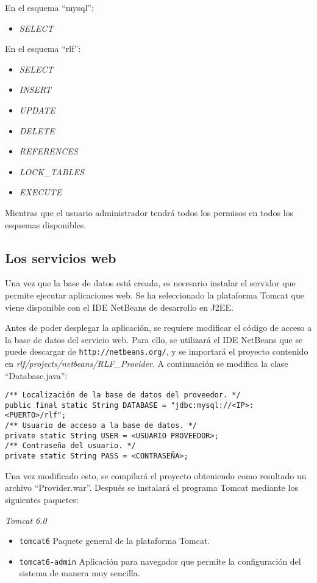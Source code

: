 En el esquema ``mysql'':
\begin{itemize}
\item \emph{SELECT}
\end{itemize}

En el esquema ``rlf'':
\begin{itemize}
\item \emph{SELECT}
\item \emph{INSERT}
\item \emph{UPDATE}
\item \emph{DELETE}
\item \emph{REFERENCES}
\item \emph{LOCK\_TABLES}
\item \emph{EXECUTE}
\end{itemize}

Mientras que el usuario administrador tendrá todos los permisos en 
todos los esquemas disponibles.

\subsection*{Los servicios web}
Una vez que la base de datos está creada, es necesario instalar el 
servidor que permite ejecutar aplicaciones web. Se ha seleccionado la 
plataforma Tomcat que viene disponible con el IDE NetBeans de 
desarrollo en J2EE.

Antes de poder desplegar la aplicación, se requiere modificar el 
código de acceso a la base de datos del servicio web. Para ello, se 
utilizará el IDE NetBeans que se puede descargar de 
\texttt{http://netbeans.org/}, y se importará el proyecto contenido en 
\emph{rlf/projects/netbeans/RLF\_Provider}. A continuación se modifica la 
clase ``Database.java'':

\begin{verbatim}
/** Localización de la base de datos del proveedor. */
public final static String DATABASE = "jdbc:mysql://<IP>:<PUERTO>/rlf";
/** Usuario de acceso a la base de datos. */
private static String USER = <USUARIO PROVEEDOR>;
/** Contraseña del usuario. */
private static String PASS = <CONTRASEÑA>;
\end{verbatim}

Una vez modificado esto, se compilará el proyecto obteniendo como 
resultado un archivo ``Provider.war''. Después se instalará el 
programa Tomcat mediante los siguientes paquetes:

\emph{Tomcat 6.0} 

\begin{itemize}
\item \texttt{tomcat6} Paquete general de la plataforma Tomcat.
\item \texttt{tomcat6-admin} Aplicación para navegador que permite la 
configuración del sistema de manera muy sencilla.
\end{itemize}

